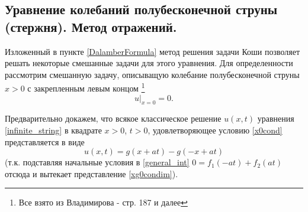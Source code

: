 \subsection{Уравнение колебаний полубесконечной струны (стержня). Метод отражений.}


Изложенный в пункте \ref{DalamberFormula} метод решения задачи Коши позволяет решать некоторые смешанные задачи для этого уравнения. Для определенности рассмотрим смешанную задачу, описыващую колебание полубесконечной струны $x > 0$ с закрепленным левым концом \footnote{Все взято из Владимирова - стр. 187 и далее}
\begin{equation} \label{x0cond}
	u |_{x = 0} = 0.
\end{equation}

Предварительно докажем, что всякое классическое решение $u(x, t)$ уравнения \eqref{infinite_string} в квадрате $x > 0$, $t > 0$, удовлетворяющее условию \eqref{x0cond} представляется в виде 
\begin{equation} \label{xg0condim}
	u(x, t) = g(x + a t) - g(-x + a t)
\end{equation}
(т.к. подставляя начальные условия в \eqref{general_int} $0 = f_1(-a t) + f_2(a t)$
отсюда и вытекает представление \eqref{xg0condim}).

